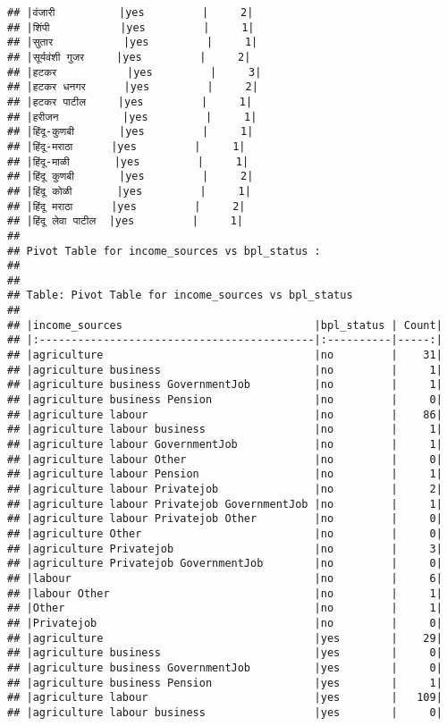 \documentclass[
]{article}
\begin{document}
\begin{verbatim}
## |वंजारी          |yes         |     2|
## |शिंपी           |yes         |     1|
## |सुतार           |yes         |     1|
## |सूर्यवंशी गुजर     |yes         |     2|
## |हटकर           |yes         |     3|
## |हटकर धनगर      |yes         |     2|
## |हटकर पाटील     |yes         |     1|
## |हरीजन          |yes         |     1|
## |हिंदू-कुणबी       |yes         |     1|
## |हिंदू-मराठा      |yes         |     1|
## |हिंदू-माळी       |yes         |     1|
## |हिंदू कुणबी       |yes         |     2|
## |हिंदू कोळी       |yes         |     1|
## |हिंदू मराठा      |yes         |     2|
## |हिंदू लेवा पाटील  |yes         |     1|
## 
## Pivot Table for income_sources vs bpl_status :
## 
## 
## Table: Pivot Table for income_sources vs bpl_status
## 
## |income_sources                              |bpl_status | Count|
## |:-------------------------------------------|:----------|-----:|
## |agriculture                                 |no         |    31|
## |agriculture business                        |no         |     1|
## |agriculture business GovernmentJob          |no         |     1|
## |agriculture business Pension                |no         |     0|
## |agriculture labour                          |no         |    86|
## |agriculture labour business                 |no         |     1|
## |agriculture labour GovernmentJob            |no         |     1|
## |agriculture labour Other                    |no         |     0|
## |agriculture labour Pension                  |no         |     1|
## |agriculture labour Privatejob               |no         |     2|
## |agriculture labour Privatejob GovernmentJob |no         |     1|
## |agriculture labour Privatejob Other         |no         |     0|
## |agriculture Other                           |no         |     0|
## |agriculture Privatejob                      |no         |     3|
## |agriculture Privatejob GovernmentJob        |no         |     0|
## |labour                                      |no         |     6|
## |labour Other                                |no         |     1|
## |Other                                       |no         |     1|
## |Privatejob                                  |no         |     0|
## |agriculture                                 |yes        |    29|
## |agriculture business                        |yes        |     0|
## |agriculture business GovernmentJob          |yes        |     0|
## |agriculture business Pension                |yes        |     1|
## |agriculture labour                          |yes        |   109|
## |agriculture labour business                 |yes        |     0|

\end{verbatim}
\end{document}
